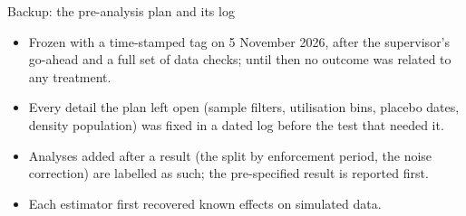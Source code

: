 \documentclass[11pt]{beamer}
\begin{document}
\begin{frame}{Backup: the pre-analysis plan and its log}
  \small
  \begin{itemize}
    \item Frozen with a time-stamped tag on 5 November 2026, after the supervisor's go-ahead and a full set of data
    checks; until then no outcome was related to any treatment.
    \item Every detail the plan left open (sample filters, utilisation bins, placebo dates, density population) was
    fixed in a dated log before the test that needed it.
    \item Analyses added after a result (the split by enforcement period, the noise correction) are labelled as such;
    the pre-specified result is reported first.
    \item Each estimator first recovered known effects on simulated data.
  \end{itemize}
\end{frame}
\end{document}
